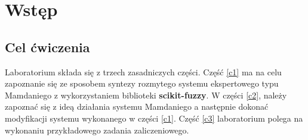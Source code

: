 \section{Wstęp}\label{sec:wstep}
\subsection{Cel ćwiczenia}\label{subsec:cel}

Laboratorium składa się z trzech zasadniczych części. Część \ref{c1} ma na celu zapoznanie się ze sposobem syntezy rozmytego systemu ekspertowego typu Mamdaniego z wykorzystaniem biblioteki \textbf{scikit-fuzzy}. W części \ref{c2}, należy zapoznać się z ideą działania systemu Mamdaniego a następnie dokonać modyfikacji systemu wykonanego w części \ref{c1}. Część \ref{c3} laboratorium polega na wykonaniu przykładowego zadania zaliczeniowego.
